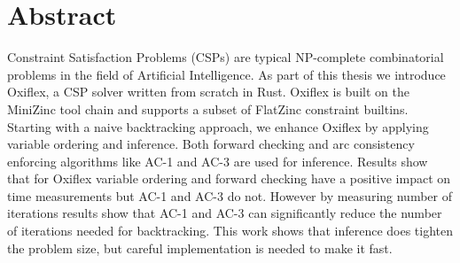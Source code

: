 
\chapter*{Abstract}

Constraint Satisfaction Problems (CSPs) are typical NP-complete combinatorial problems in the field of Artificial Intelligence. As part of this thesis we introduce Oxiflex, a CSP solver written from scratch in Rust. Oxiflex is built on the MiniZinc tool chain and supports a subset of FlatZinc constraint builtins. Starting with a naive backtracking approach, we enhance Oxiflex by applying variable ordering and inference. Both forward checking and arc consistency enforcing algorithms like AC-1 and AC-3 are used for inference. Results show that for Oxiflex variable ordering and forward checking have a positive impact on time measurements but AC-1 and AC-3 do not. However by measuring number of iterations results show that AC-1 and AC-3 can significantly reduce the number of iterations needed for backtracking. This work shows that inference does tighten the problem size, but careful implementation is needed to make it fast.

